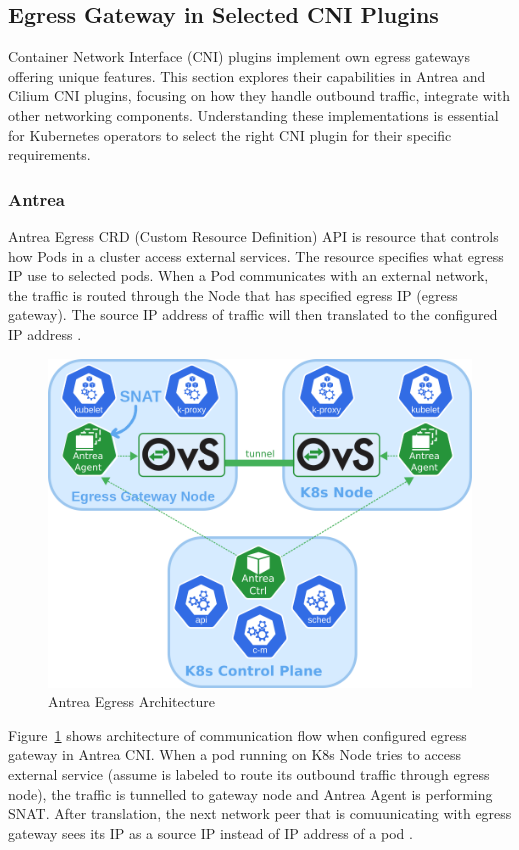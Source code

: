\subsection{Egress Gateway in Selected CNI Plugins}
\label{subsection:egressGateway}

Container Network Interface (CNI) plugins implement own egress gateways offering unique features. This section explores their capabilities in Antrea and Cilium CNI plugins, focusing on how they handle outbound traffic, integrate with other networking components. Understanding these implementations is essential for Kubernetes operators to select the right CNI plugin for their specific requirements.


\subsubsection{Antrea}
\label{subsection:antreaEgress}

Antrea Egress CRD (Custom Resource Definition) API is resource that controls how Pods in a cluster access external services. The resource specifies what egress IP use to selected pods. When a Pod communicates with an external network, the traffic is routed through the Node that has specified egress IP (egress gateway). The source IP address of traffic will then translated to the configured IP address \cite{AntreaEgressArch}.

\begin{figure}[tbh]
    \centering
    \includegraphics[width=0.6\columnwidth]{images/antrea_overview.png}
    \caption{Antrea Egress Architecture \cite{AntreaEgressArch}}
    \label{fig:antreaEgressArch}
\end{figure}


Figure~\ref{fig:antreaEgressArch} shows architecture of communication flow when configured egress gateway in Antrea CNI. When a pod running on K8s Node tries to access external service (assume is labeled to route its outbound traffic through egress node), the traffic is tunnelled to gateway node and Antrea Agent is performing SNAT. After translation, the next network peer that is comuunicating with egress gateway sees its IP as a source IP instead of IP address of a pod \cite{AntreaEgressArch} \cite{AntreaSNAT}. 

